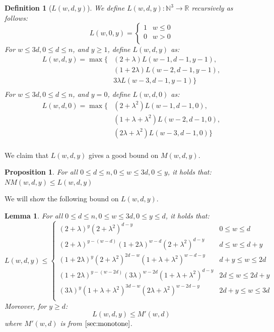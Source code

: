 \documentclass[10pt,a4paper]{article}
\newtheorem{lemma}{Lemma}
\newtheorem{prop}{Proposition}
\newtheorem{definition}{Definition}
\newcommand{\N}{\mathbb{N}}
\newcommand{\R}{\mathbb{R}}
\newcommand{\openinteger}{y}
\begin{document}
\begin{definition}[$L(w, d, \openinteger)$]
\label{def:Lwdo}
We define $L(w, d, \openinteger): \N^3\rightarrow \R$ recursively as follows:
\[
L(w, 0, \openinteger) = 
\begin{cases}
1 & w \le 0\\
0 & w > 0\\
\end{cases}
\]
For $w\le 3d, 0\le d\le n$, and $\openinteger \ge 1$, define $L(w, d, \openinteger)$ as:
\begin{align*}
L(w, d, \openinteger) = 
\max\{
& (2+\lambda) L(w-1, d-1, \openinteger-1),\\
& (1+2\lambda) L(w-2, d-1, \openinteger-1),\\
& 3\lambda L(w-3, d-1, \openinteger-1)
\}\\
\end{align*}
For $w\le 3d, 0\le d\le n$, and $\openinteger = 0$, define $L(w, d, 0)$ as:
\begin{align*}
L(w, d, 0) =
\max\{
& (2+\lambda^2) L(w-1, d-1, 0),\\
& (1+\lambda+\lambda^2) L(w-2, d-1, 0),\\
& (2\lambda + \lambda^2) L(w-3, d-1, 0)
\}\\
\end{align*}
\end{definition}

We claim that $L(w, d, \openinteger)$ gives a good bound on $M(w, d, \openinteger)$.

\begin{prop} 
\label{claim:NMwd-recurrence}
For all $0\le d\le n, 0\le w\le 3d, 0\le \openinteger$, it holds that:
$NM(w, d, \openinteger) \le L(w, d, \openinteger)$
\end{prop}

We will show the following bound on $L(w, d, \openinteger)$.

\begin{lemma} 
\label{lem:Lwdo}
For all $0\le d\le n, 0\le w\le 3d, 0\le \openinteger\le d$, it holds that:
\[
L(w,d,\openinteger) \le
\begin{cases}
(2+\lambda)^{\openinteger}(2+\lambda^2)^{d-\openinteger}
 & 0\le w \le d\\
(2+\lambda)^{\openinteger - (w-d)}(1+2\lambda)^{w-d}(2+\lambda^2)^{d-\openinteger}
 & d\le w \le d + \openinteger\\
(1+2\lambda)^{\openinteger}(2+\lambda^2)^{2d-w}(1+\lambda+\lambda^2)^{w-d-\openinteger}
& d+\openinteger\le w\le 2d\\
(1+2\lambda)^{\openinteger - (w-2d)}(3\lambda)^{w-2d}(1+\lambda+\lambda^2)^{d-\openinteger}
& 2d\le w\le 2d+\openinteger\\
(3\lambda)^{\openinteger}(1+\lambda+\lambda^2)^{3d-w}(2\lambda + \lambda^2)^{w-2d-\openinteger}
& 2d+\openinteger\le w\le 3d\\
\end{cases}
\]
Moreover, for $\openinteger \ge d$:
\[
   L(w, d, \openinteger) \le M'(w, d)
\]
where $M'(w, d)$ is from $\cref{sec:monotone}$.
\end{lemma}
\end{document}
